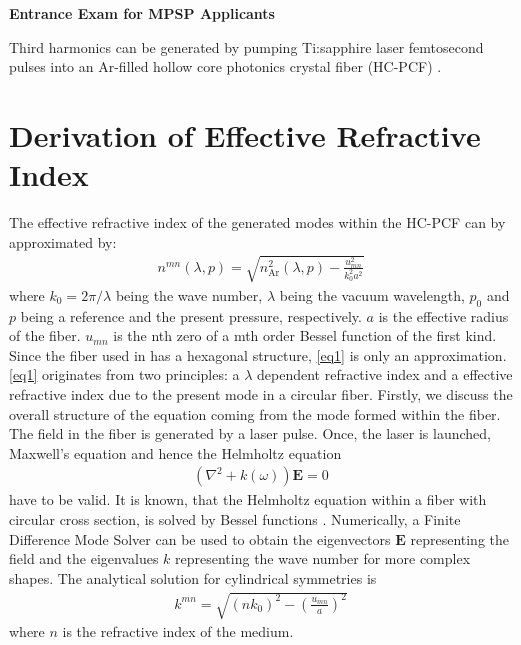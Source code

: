 \documentclass[fleqn, 10pt, twocolumn]{SelfArx}
\affiliation{\textsuperscript{1}\textit{Department of Biology, University of Examples, London, United Kingdom}} %
\begin{document}
%
\begin{center}
\colorbox{color2!10}{ \large \textcolor{color1}{\sffamily\bfseries\phantom{as}Entrance Exam for MPSP Applicants\phantom{as}}}
\end{center}
    Third harmonics can be generated by pumping Ti:sapphire laser femtosecond pulses into an Ar-filled hollow core photonics crystal fiber (HC-PCF) \cite{Nold2010}.

    \section{Derivation of Effective Refractive Index}
    The effective refractive index of the generated modes within the HC-PCF can by approximated by:
    \begin{align}
        n^{mn}(\lambda, p) = \sqrt{n^2_{\text{Ar}}(\lambda, p ) - \frac{u_{mn}^2}{k_0^2 a^2}} 
        \label{eq1}
    \end{align}
    where $k_0=2\pi/\lambda$ being the wave number, $\lambda$ being the vacuum wavelength, $p_0$ and $p$ being a reference and the present pressure, respectively. $a$ is the 
    effective radius of the fiber. $u_{mn}$ is the nth zero of a mth order Bessel function of the first kind. Since the fiber used in \cite{Nold2010} has a hexagonal structure, \autoref{eq1} is only an approximation.
    \autoref{eq1} originates from two principles: a $\lambda$ dependent refractive index and a effective refractive index due to the present mode in a circular fiber.
    Firstly, we discuss the overall structure of the equation coming from the mode formed within the fiber. The field in the fiber is generated by a laser pulse. Once, the laser is launched, Maxwell's equation and hence the Helmholtz equation 
    \begin{align}
        \left(\nabla^2 + k(\omega)\right) \mathbf E = 0
        \label{eq:helmholtz}
    \end{align}
    have to be valid.
    It is known, that the Helmholtz equation within a fiber with circular cross section, is solved by Bessel functions \cite{Nickelson2019}. 
    Numerically, a Finite Difference Mode Solver can be used to obtain the eigenvectors $\mathbf E$ representing the field and the eigenvalues $k$ representing the wave number for more complex shapes. The analytical solution for cylindrical symmetries is 
    \begin{align}
        k^{mn} = \sqrt{(n k_0)^2 - \left( \frac{u_{mn}}{a}\right)^2}
    \end{align}
    where $n$ is the refractive index of the medium.
\end{document}
